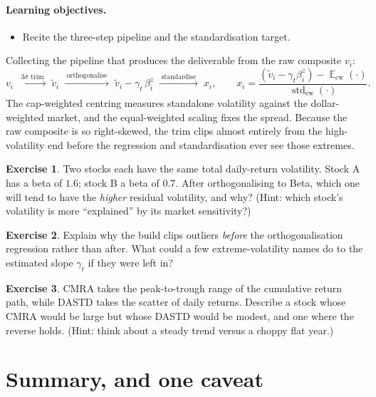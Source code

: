 \documentclass[11pt]{article}
\theoremstyle{definition}
\newtheorem{exercise}{Exercise}[section]
\theoremstyle{plain}
\theoremstyle{remark}
\DeclareMathOperator{\std}{std}
\DeclareMathOperator*{\avg}{\mathbb{E}}
\begin{document}
\paragraph{Learning objectives.}
\begin{itemize}[leftmargin=1.4em,topsep=2pt]
  \item Recite the three-step pipeline and the standardisation target.
\end{itemize}

Collecting the pipeline that produces the deliverable from the raw composite $v_i$:
\[
v_i \;\xrightarrow{\;\text{3$\sigma$ trim}\;}\; \tilde v_i
\;\xrightarrow{\;\text{orthogonalise}\;}\; \tilde v_i - \gamma_t\,\beta^{z}_i
\;\xrightarrow{\;\text{standardise}\;}\; x_i,
\qquad
x_i = \frac{(\tilde v_i - \gamma_t\beta^{z}_i) - \avg_{\text{cw}}(\cdot)}{\std_{\text{ew}}(\cdot)}.
\]
The cap-weighted centring measures standalone volatility against the dollar-weighted market, and the equal-weighted scaling fixes the spread. Because the raw composite is so right-skewed, the trim clips almost entirely from the high-volatility end before the regression and standardisation ever see those extremes.

\begin{exercise}
Two stocks each have the same total daily-return volatility. Stock A has a beta of $1.6$; stock B a beta of $0.7$. After orthogonalising to Beta, which one will tend to have the \emph{higher} residual volatility, and why? (Hint: which stock's volatility is more ``explained'' by its market sensitivity?)
\end{exercise}

\begin{exercise}
Explain why the build clips outliers \emph{before} the orthogonalisation regression rather than after. What could a few extreme-volatility names do to the estimated slope $\gamma_t$ if they were left in?
\end{exercise}

\begin{exercise}
CMRA takes the peak-to-trough range of the cumulative return path, while DASTD takes the scatter of daily returns. Describe a stock whose CMRA would be large but whose DASTD would be modest, and one where the reverse holds. (Hint: think about a steady trend versus a choppy flat year.)
\end{exercise}

\section{Summary, and one caveat}\label{sec:summary}
\end{document}
